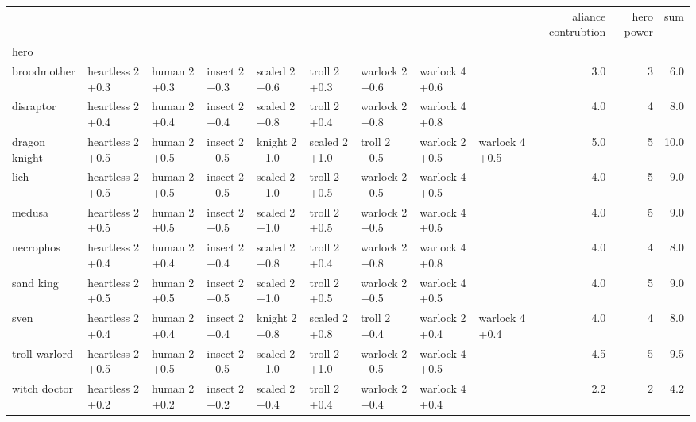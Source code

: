 \documentclass{article}
\begin{document}
\resizebox{17cm}{!} {
\begin{tabular}{l|llllllll|rrr}
\toprule
{} &                   &               &                &                &                &                  &                  &                  &  aliance contrubtion &  hero power &   sum \\
hero          &                    &                &                 &                 &                 &                   &                   &                   &                      &             &       \\
\midrule
broodmother   &  heartless 2 +0.3  &  human 2 +0.3  &  insect 2 +0.3  &  scaled 2 +0.6  &   troll 2 +0.3  &  warlock  2 +0.6  &  warlock  4 +0.6  &                   &                  3.0 &           3 &   6.0 \\
disraptor     &  heartless 2 +0.4  &  human 2 +0.4  &  insect 2 +0.4  &  scaled 2 +0.8  &   troll 2 +0.4  &  warlock  2 +0.8  &  warlock  4 +0.8  &                   &                  4.0 &           4 &   8.0 \\
dragon knight &  heartless 2 +0.5  &  human 2 +0.5  &  insect 2 +0.5  &  knight 2 +1.0  &  scaled 2 +1.0  &     troll 2 +0.5  &  warlock  2 +0.5  &  warlock  4 +0.5  &                  5.0 &           5 &  10.0 \\
lich          &  heartless 2 +0.5  &  human 2 +0.5  &  insect 2 +0.5  &  scaled 2 +1.0  &   troll 2 +0.5  &  warlock  2 +0.5  &  warlock  4 +0.5  &                   &                  4.0 &           5 &   9.0 \\
medusa        &  heartless 2 +0.5  &  human 2 +0.5  &  insect 2 +0.5  &  scaled 2 +1.0  &   troll 2 +0.5  &  warlock  2 +0.5  &  warlock  4 +0.5  &                   &                  4.0 &           5 &   9.0 \\
necrophos     &  heartless 2 +0.4  &  human 2 +0.4  &  insect 2 +0.4  &  scaled 2 +0.8  &   troll 2 +0.4  &  warlock  2 +0.8  &  warlock  4 +0.8  &                   &                  4.0 &           4 &   8.0 \\
sand king     &  heartless 2 +0.5  &  human 2 +0.5  &  insect 2 +0.5  &  scaled 2 +1.0  &   troll 2 +0.5  &  warlock  2 +0.5  &  warlock  4 +0.5  &                   &                  4.0 &           5 &   9.0 \\
sven          &  heartless 2 +0.4  &  human 2 +0.4  &  insect 2 +0.4  &  knight 2 +0.8  &  scaled 2 +0.8  &     troll 2 +0.4  &  warlock  2 +0.4  &  warlock  4 +0.4  &                  4.0 &           4 &   8.0 \\
troll warlord &  heartless 2 +0.5  &  human 2 +0.5  &  insect 2 +0.5  &  scaled 2 +1.0  &   troll 2 +1.0  &  warlock  2 +0.5  &  warlock  4 +0.5  &                   &                  4.5 &           5 &   9.5 \\
witch doctor  &  heartless 2 +0.2  &  human 2 +0.2  &  insect 2 +0.2  &  scaled 2 +0.4  &   troll 2 +0.4  &  warlock  2 +0.4  &  warlock  4 +0.4  &                   &                  2.2 &           2 &   4.2 \\
\bottomrule
\end{tabular}
}
\end{document}
